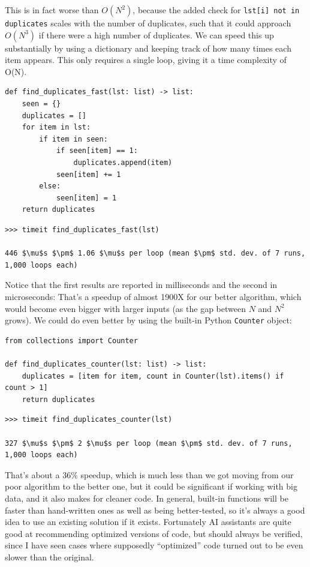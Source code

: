 This is in fact worse than $O(N^2)$, because the added check for \texttt{lst[i] not in duplicates} scales with the number of duplicates, such that it could approach $O(N^3)$ if there were a high number of duplicates. We can speed this up substantially by using a dictionary and keeping track of how many times each item appears.  This only requires a single loop, giving it a time complexity of O(N).

\begin{lstlisting}[style=Python]
def find_duplicates_fast(lst: list) -> list:
    seen = {}
    duplicates = []
    for item in lst:
        if item in seen:
            if seen[item] == 1:
                duplicates.append(item)
            seen[item] += 1
        else:
            seen[item] = 1
    return duplicates

\end{lstlisting}

\begin{lstlisting}[style=replshort, mathescape=true]
>>> timeit find_duplicates_fast(lst)

446 $\mu$s $\pm$ 1.06 $\mu$s per loop (mean $\pm$ std. dev. of 7 runs, 1,000 loops each)
\end{lstlisting}

Notice that the first results are reported in milliseconds and the second in microseconds: That's a speedup of almost 1900X for our better algorithm, which would become even bigger with larger inputs (as the gap between $N$ and $N^2$ grows).  We could do even better by using the built-in Python \texttt{Counter} object:

\begin{lstlisting}[style=Python]
from collections import Counter

def find_duplicates_counter(lst: list) -> list:
    duplicates = [item for item, count in Counter(lst).items() if count > 1]
    return duplicates

\end{lstlisting}

\begin{lstlisting}[style=replshort, mathescape=true]
>>> timeit find_duplicates_counter(lst)

327 $\mu$s $\pm$ 2 $\mu$s per loop (mean $\pm$ std. dev. of 7 runs, 1,000 loops each)
\end{lstlisting}

That's about a 36\% speedup, which is much less than we got moving from our poor algorithm to the better one, but it could be significant if working with big data, and it also makes for cleaner code.  In general, built-in functions will be faster than hand-written ones as well as being better-tested, so it's always a good idea to use an existing solution if it exists.  Fortunately AI assistants are quite good at recommending optimized versions of code, but should always be verified, since I have seen cases where supposedly ``optimized'' code turned out to be even slower than the original.

